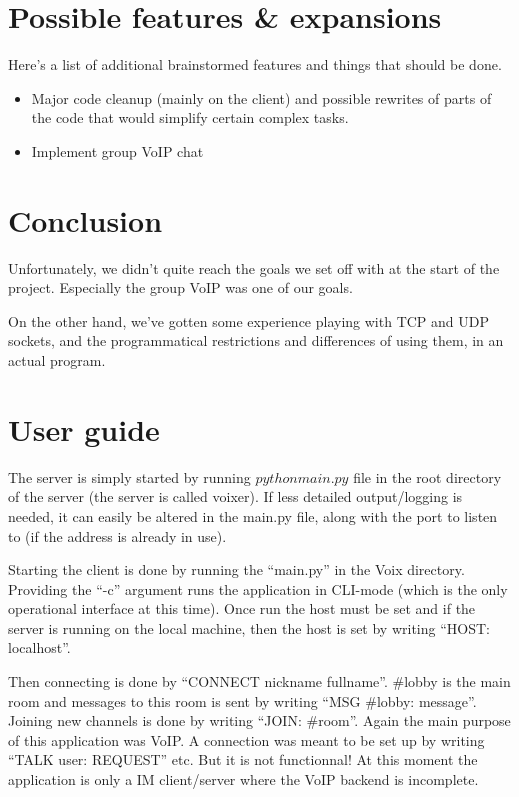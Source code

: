 \documentclass[12pt]{rapport}
\begin{document}
\section*{Possible features \& expansions}
Here's a list of additional brainstormed features and things that
should be done.
\begin{itemize}
\item Major code cleanup (mainly on the client) and possible
  rewrites of parts of the code that would simplify certain complex
  tasks.
\item Implement group VoIP chat
\end{itemize}


\newpage
\section*{Conclusion}
Unfortunately, we didn't quite reach the goals we set off with at the
start of the project. Especially the group VoIP was one of our goals.

On the other hand, we've gotten some experience playing with TCP and UDP
sockets, and the programmatical restrictions and differences of using them,
in an actual program.



\newpage
\section*{User guide}
The server is simply started by running $python main.py$ file in the
root directory of the server (the server is called voixer). If less
detailed output/logging is needed, it can easily be altered in the
main.py file, along with the port to listen to (if the address is
already in use).

Starting the client is done by running the ``main.py'' in the Voix
directory. Providing the ``-c'' argument runs the application in
CLI-mode (which is the only operational interface at this time). Once
run the host must be set and if the server is running on the local
machine, then the host is set by writing ``HOST: localhost''.

Then connecting is done by ``CONNECT nickname fullname''. \#lobby is
the main room and messages to this room is sent by writing ``MSG
\#lobby: message''. Joining new channels is done by writing ``JOIN:
\#room''. Again the main purpose of this application was VoIP. A
connection was meant to be set up by writing ``TALK user: REQUEST''
etc. But it is not functionnal! At this moment the application is only
a IM client/server where the VoIP backend is incomplete.
\end{document}
